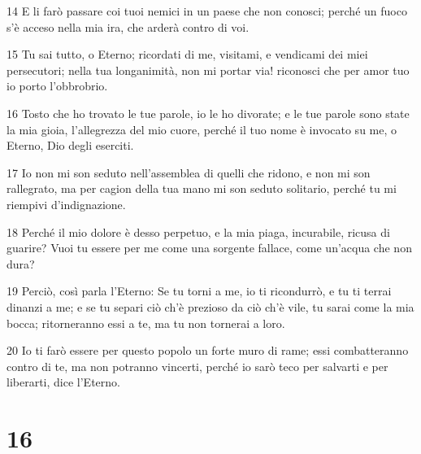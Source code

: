 \par 14 E li farò passare coi tuoi nemici in un paese che non conosci; perché un fuoco s'è acceso nella mia ira, che arderà contro di voi.
\par 15 Tu sai tutto, o Eterno; ricordati di me, visitami, e vendicami dei miei persecutori; nella tua longanimità, non mi portar via! riconosci che per amor tuo io porto l'obbrobrio.
\par 16 Tosto che ho trovato le tue parole, io le ho divorate; e le tue parole sono state la mia gioia, l'allegrezza del mio cuore, perché il tuo nome è invocato su me, o Eterno, Dio degli eserciti.
\par 17 Io non mi son seduto nell'assemblea di quelli che ridono, e non mi son rallegrato, ma per cagion della tua mano mi son seduto solitario, perché tu mi riempivi d'indignazione.
\par 18 Perché il mio dolore è desso perpetuo, e la mia piaga, incurabile, ricusa di guarire? Vuoi tu essere per me come una sorgente fallace, come un'acqua che non dura?
\par 19 Perciò, così parla l'Eterno: Se tu torni a me, io ti ricondurrò, e tu ti terrai dinanzi a me; e se tu separi ciò ch'è prezioso da ciò ch'è vile, tu sarai come la mia bocca; ritorneranno essi a te, ma tu non tornerai a loro.
\par 20 Io ti farò essere per questo popolo un forte muro di rame; essi combatteranno contro di te, ma non potranno vincerti, perché io sarò teco per salvarti e per liberarti, dice l'Eterno.

\chapter{16}

